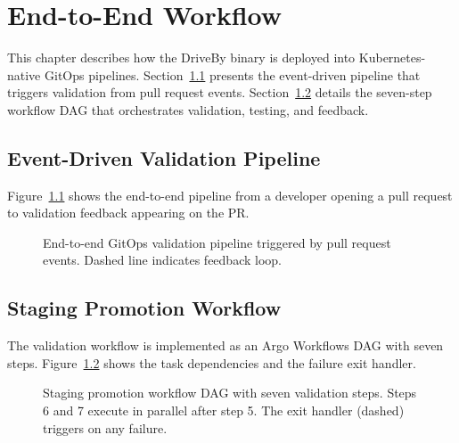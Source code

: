 \chapter{End-to-End Workflow}
\label{ch:workflow}

This chapter describes how the DriveBy binary is deployed into Kubernetes-native GitOps pipelines. Section~\ref{sec:event-pipeline} presents the event-driven pipeline that triggers validation from pull request events. Section~\ref{sec:staging-dag} details the seven-step workflow DAG that orchestrates validation, testing, and feedback.

\section{Event-Driven Validation Pipeline}
\label{sec:event-pipeline}

Figure~\ref{fig:gitops-pipeline} shows the end-to-end pipeline from a developer opening a pull request to validation feedback appearing on the PR.

\begin{figure}[htbp]
\centering
\resizebox{\textwidth}{!}{%
%
}
\caption{End-to-end GitOps validation pipeline triggered by pull request events. Dashed line indicates feedback loop.}
\label{fig:gitops-pipeline}
\end{figure}

\section{Staging Promotion Workflow}
\label{sec:staging-dag}

The validation workflow is implemented as an Argo Workflows DAG with seven steps. Figure~\ref{fig:staging-dag} shows the task dependencies and the failure exit handler.

\begin{figure}[htbp]
\centering

\caption{Staging promotion workflow DAG with seven validation steps. Steps 6 and 7 execute in parallel after step 5. The exit handler (dashed) triggers on any failure.}
\label{fig:staging-dag}
\end{figure}


